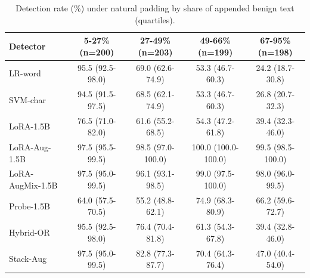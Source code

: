 \begin{table}[t]
\centering
\caption{Detection rate (\%) under natural padding by share of appended benign text (quartiles).}
\label{tab:dose}
\footnotesize
\begin{tabular}{lcccc}
\toprule
\textbf{Detector} & \textbf{5-27\% (n=200)} & \textbf{27-49\% (n=203)} & \textbf{49-66\% (n=199)} & \textbf{67-95\% (n=198)} \\
\midrule
LR-word & 95.5 (92.5-98.0) & 69.0 (62.6-74.9) & 53.3 (46.7-60.3) & 24.2 (18.7-30.8) \\
SVM-char & 94.5 (91.5-97.5) & 68.5 (62.1-74.9) & 53.3 (46.7-60.3) & 26.8 (20.7-32.3) \\
LoRA-1.5B & 76.5 (71.0-82.0) & 61.6 (55.2-68.5) & 54.3 (47.2-61.8) & 39.4 (32.3-46.0) \\
LoRA-Aug-1.5B & 97.5 (95.5-99.5) & 98.5 (97.0-100.0) & 100.0 (100.0-100.0) & 99.5 (98.5-100.0) \\
LoRA-AugMix-1.5B & 97.5 (95.0-99.5) & 96.1 (93.1-98.5) & 99.0 (97.5-100.0) & 98.0 (96.0-99.5) \\
Probe-1.5B & 64.0 (57.5-70.5) & 55.2 (48.8-62.1) & 74.9 (68.3-80.9) & 66.2 (59.6-72.7) \\
Hybrid-OR & 95.5 (92.5-98.0) & 76.4 (70.4-81.8) & 61.3 (54.3-67.8) & 39.4 (32.8-46.0) \\
Stack-Aug & 97.5 (95.0-99.5) & 82.8 (77.3-87.7) & 70.4 (64.3-76.4) & 47.0 (40.4-54.0) \\
\bottomrule
\end{tabular}
\end{table}